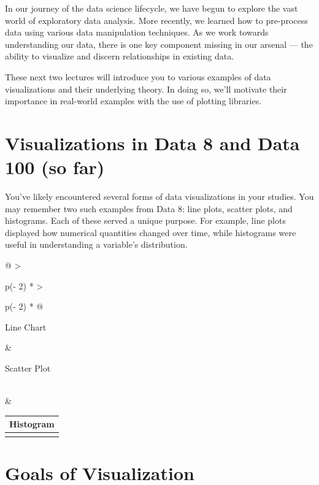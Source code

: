 \documentclass[
  letterpaper,
  DIV=11,
  numbers=noendperiod]{scrreprt}
\begin{document}
In our journey of the data science lifecycle, we have begun to explore
the vast world of exploratory data analysis. More recently, we learned
how to pre-process data using various data manipulation techniques. As
we work towards understanding our data, there is one key component
missing in our arsenal --- the ability to visualize and discern
relationships in existing data.

These next two lectures will introduce you to various examples of data
visualizations and their underlying theory. In doing so, we'll motivate
their importance in real-world examples with the use of plotting
libraries.

\section{Visualizations in Data 8 and Data 100 (so
far)}\label{visualizations-in-data-8-and-data-100-so-far}

You've likely encountered several forms of data visualizations in your
studies. You may remember two such examples from Data 8: line plots,
scatter plots, and histograms. Each of these served a unique purpose.
For example, line plots displayed how numerical quantities changed over
time, while histograms were useful in understanding a variable's
distribution.

\begin{longtable}[]{@{}
  >{\raggedright\arraybackslash}p{(\columnwidth - 2\tabcolsep) * }
  >{\raggedright\arraybackslash}p{(\columnwidth - 2\tabcolsep) * }@{}}
\toprule\noalign{}
\begin{minipage}[b]{\linewidth}\raggedright
Line Chart
\end{minipage} & \begin{minipage}[b]{\linewidth}\raggedright
Scatter Plot
\end{minipage} \\
\midrule\noalign{}
\endhead
\bottomrule\noalign{}
\endlastfoot
& \\
\end{longtable}

\begin{longtable}[]{@{}l@{}}
\toprule\noalign{}
Histogram \\
\midrule\noalign{}
\endhead
\bottomrule\noalign{}
\endlastfoot
 \\
\end{longtable}

\section{Goals of Visualization}\label{goals-of-visualization}
\end{document}
